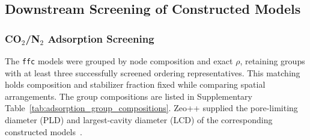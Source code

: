 \documentclass[a5paper, 10pt]{article}
\begin{document}
\subsection{Downstream Screening of Constructed Models}
\label{sec:screening}
\subsubsection{\texorpdfstring{CO$_2$/N$_2$ Adsorption Screening}{CO2/N2 Adsorption Screening}}

The \texttt{ffc} models were grouped by node composition and exact $\rho$, retaining groups with at least three successfully screened ordering representatives. This matching holds composition and stabilizer fraction fixed while comparing spatial arrangements. The group compositions are listed in Supplementary Table~\ref{tab:adsorption_group_compositions}. Zeo++ supplied the pore-limiting diameter (PLD) and largest-cavity diameter (LCD) of the corresponding constructed models~\cite{willems2012algorithms}.
\end{document}
